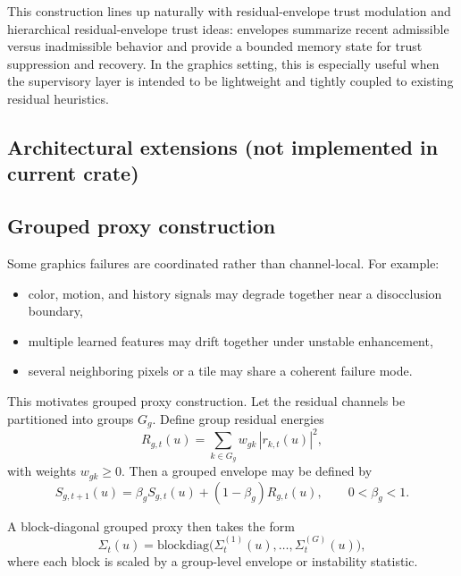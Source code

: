 \documentclass[11pt]{article}
\theoremstyle{definition}
\theoremstyle{plain}
\begin{document}
This construction lines up naturally with residual-envelope trust modulation and hierarchical residual-envelope trust ideas: envelopes summarize recent admissible versus inadmissible behavior and provide a bounded memory state for trust suppression and recovery. In the graphics setting, this is especially useful when the supervisory layer is intended to be lightweight and tightly coupled to existing residual heuristics.


\subsection*{Architectural extensions (not implemented in current crate)}


\subsection{Grouped proxy construction}

Some graphics failures are coordinated rather than channel-local. For example:
\begin{itemize}[leftmargin=1.5em]
    \item color, motion, and history signals may degrade together near a disocclusion boundary,
    \item multiple learned features may drift together under unstable enhancement,
    \item several neighboring pixels or a tile may share a coherent failure mode.
\end{itemize}

This motivates grouped proxy construction. Let the residual channels be partitioned into groups $G_g$. Define group residual energies
\begin{equation}
R_{g,t}(u)=\sum_{k\in G_g} w_{gk}\,|r_{k,t}(u)|^2,
\end{equation}
with weights $w_{gk}\ge 0$. Then a grouped envelope may be defined by
\begin{equation}
S_{g,t+1}(u)=\beta_g S_{g,t}(u) + (1-\beta_g)R_{g,t}(u),
\qquad 0<\beta_g<1.
\end{equation}

A block-diagonal grouped proxy then takes the form
\begin{equation}
\Sigma_t(u)=\mathrm{blockdiag}\!\bigl(
\Sigma^{(1)}_t(u),\dots,\Sigma^{(G)}_t(u)
\bigr),
\end{equation}
where each block is scaled by a group-level envelope or instability statistic.
\end{document}
